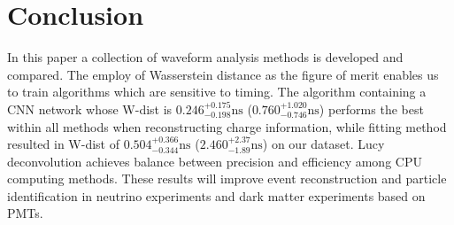 \section{Conclusion} %
\label{sec:conclusion}

In this paper a collection of waveform analysis methods is developed and compared. The employ of Wasserstein distance as the figure of merit enables us to train algorithms which are sensitive to timing. The algorithm containing a CNN network whose W-dist is $0.246^{+0.175}_{-0.198}\mathrm{ns}$ ($0.760^{+1.020}_{-0.746}\mathrm{ns}$) performs the best within all methods when reconstructing charge information, while fitting method resulted in W-dist of $0.504^{+0.366}_{-0.344}\mathrm{ns}$ ($2.460^{+2.37}_{-1.89}\mathrm{ns}$) on our dataset. Lucy deconvolution achieves balance between precision and efficiency among CPU computing methods. These results will improve event reconstruction and particle identification in neutrino experiments and dark matter experiments based on PMTs. 


